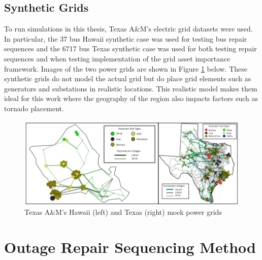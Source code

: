 \documentclass[12pt]{article}
\begin{document}
\subsection{Synthetic Grids}
To run simulations in this thesis, Texas A\&M’s electric grid datasets \cite{lii} were used. In particular, the 37 bus Hawaii synthetic case was used for testing bus repair sequences and the 6717 bus Texas synthetic case was used for both testing repair sequences and when testing implementation of the grid asset importance framework. Images of the two power grids are shown in Figure \ref{fig:pgrids} below. These synthetic grids do not model the actual grid but do place grid elements such as generators and substations in realistic locations. This realistic model makes them ideal for this work where the geography of the region also impacts factors such as tornado placement.
\begin{figure}[ht]
    \centering %
    \includegraphics[width=\textwidth]{Mock Grids 2.png}
    \caption[Images of Texas A\&M's  Hawaii and Texas mock power grids]{Texas A\&M's  Hawaii (left) and Texas (right) mock power grids \cite{texasam}}
    \label{fig:pgrids}
\end{figure}
\newpage
\section{Outage Repair Sequencing Method} \label{Costfinding}
\end{document}
